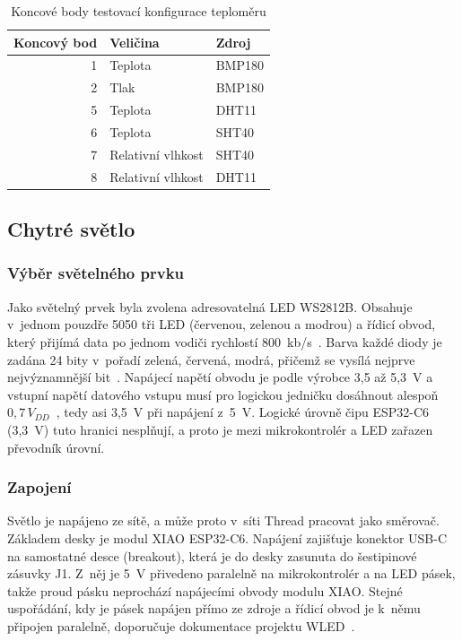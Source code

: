 \begin{table}[ht]
\centering
\small
\caption{Koncové body testovací konfigurace teploměru}
\label{tab:endpointy}
\begin{tabular}{rll}
\hline
Koncový bod & Veličina & Zdroj \\
\hline
1 & Teplota & BMP180 \\
2 & Tlak & BMP180 \\
5 & Teplota & DHT11 \\
6 & Teplota & SHT40 \\
7 & Relativní vlhkost & SHT40 \\
8 & Relativní vlhkost & DHT11 \\
\hline
\end{tabular}
\end{table}

\subsection{Chytré světlo}

\subsubsection{Výběr světelného prvku}

Jako světelný prvek byla zvolena adresovatelná LED WS2812B. Obsahuje
v~jednom pouzdře 5050 tři LED (červenou, zelenou a modrou) a řídicí obvod,
který přijímá data po jednom vodiči rychlostí 800~kb/s~\cite{worldsemi-ws2812b}.
Barva každé diody je zadána 24 bity v~pořadí zelená, červená, modrá,
přičemž se vysílá nejprve nejvýznamnější bit~\cite{worldsemi-ws2812b}.
Napájecí napětí obvodu je podle výrobce 3,5 až 5,3~V a vstupní napětí
datového vstupu musí pro logickou jedničku dosáhnout alespoň
$0{,}7\,V_{DD}$~\cite{worldsemi-ws2812b}, tedy asi 3,5~V při napájení
z~5~V. Logické úrovně čipu ESP32-C6 (3,3~V) tuto hranici nesplňují, a proto
je mezi mikrokontrolér a LED zařazen převodník úrovní.

\subsubsection{Zapojení}

Světlo je napájeno ze sítě, a může proto v~síti Thread pracovat jako směrovač.
Základem desky je modul XIAO ESP32-C6. Napájení zajišťuje konektor USB-C
na samostatné desce (breakout), která je do desky zasunuta do šestipinové
zásuvky J1. Z~něj je 5~V přivedeno paralelně na mikrokontrolér a na LED
pásek, takže proud pásku neprochází napájecími obvody modulu XIAO. Stejné
uspořádání, kdy je pásek napájen přímo ze zdroje a řídicí obvod je k~němu
připojen paralelně, doporučuje dokumentace projektu WLED~\cite{wled-wiring}.

